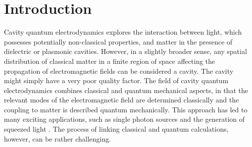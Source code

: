 \documentclass[10pt,letterpaper]{article}
\begin{document}





\section{Introduction}

Cavity quantum electrodynamics explores the interaction between light, which possesses potentially non-classical properties, and matter in the presence of dielectric or plasmonic cavities. However, in a slightly broader sense, any spatial distribution of classical matter in a finite region of space affecting the propagation of electromagnetic fields can be considered a cavity. The cavity might simply have a very poor quality factor. The field of cavity quantum electrodynamics combines classical and quantum mechanical aspects, in that the relevant modes of the electromagnetic field are determined classically and the coupling to matter is described quantum mechanically. This approach has led to many exciting applications, such as single photon sources \cite{McKeever2003, Press2007, Schietinger2009, Claudon2010, Esteban2010, Birowosuto2012, Busson2012, Filter2014, Nowak2014, Straubel2016} and the generation of squeezed light \cite{Michler2000, Lounis2000, Safavi2013, Martin-Cano2014}. The process of linking classical and quantum calculations, however, can be rather challenging. 
\end{document}
